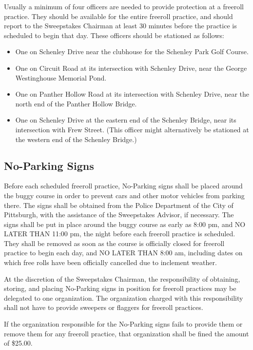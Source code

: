 Usually a minimum of four officers are needed to provide protection at a freeroll practice. They should be available for the entire freeroll practice, and should report to the Sweepstakes Chairman at least 30 minutes before the practice is scheduled to begin that day. These officers should be stationed as follows:
\begin{itemize}
	\item One on Schenley Drive near the clubhouse for the Schenley Park Golf Course.
	\item One on Circuit Road at its intersection with Schenley Drive, near the George Westinghouse Memorial Pond.
	\item One on Panther Hollow Road at its intersection with Schenley Drive, near the north end of the Panther Hollow Bridge.
	\item One on Schenley Drive at the eastern end of the Schenley Bridge, near its intersection with Frew Street. (This officer might alternatively be stationed at the western end of the Schenley Bridge.)
\end{itemize}

\subsection{No-Parking Signs}

Before each scheduled freeroll practice, No-Parking signs shall be placed around the buggy course in order to prevent cars and other motor vehicles from parking there. The signs shall be obtained from the Police Department of the City of Pittsburgh, with the assistance of the Sweepstakes Advisor, if necessary. The signs shall be put in place around the buggy course as early as 8:00 pm, and NO LATER THAN 11:00 pm, the night before each freeroll practice is scheduled. They shall be removed as soon as the course is officially closed for freeroll practice to begin each day, and NO LATER THAN 8:00 am, including dates on which free rolls have been officially cancelled due to inclement weather.

At the discretion of the Sweepstakes Chairman, the responsibility of obtaining, storing, and placing No-Parking signs in position for freeroll practices may be delegated to one organization. The organization charged with this responsibility shall not have to provide sweepers or flaggers for freeroll practices.

If the organization responsible for the No-Parking signs fails to provide them or remove them for any freeroll practice, that organization shall be fined the amount of \$25.00.

